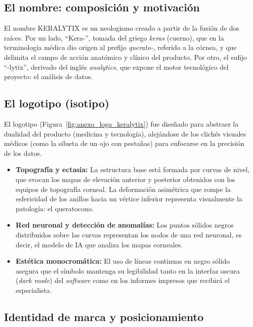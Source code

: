     \subsection*{El nombre: composición y motivación}

        El nombre KERALYTIX es un neologismo creado a partir de la fusión de dos raíces. Por un lado, ``Kera-'', tomada del griego \textit{keras} (cuerno), que en la terminología médica dio origen al prefijo \textit{querato-}, referido a la córnea, y que delimita el campo de acción anatómico y clínico del producto. Por otro, el sufijo ``-lytix'', derivado del inglés \textit{analytics}, que expone el motor tecnológico del proyecto: el análisis de datos.

    \subsection*{El logotipo (isotipo)}

        El logotipo (Figura~\ref{fig:anexo_logo_keralytix}) fue diseñado para abstraer la dualidad del producto (medicina y tecnología), alejándose de los clichés visuales médicos (como la silueta de un ojo con pestañas) para enfocarse en la precisión de los datos.

        \begin{itemize}[leftmargin=*]
            \item \textbf{Topografía y ectasia:} La estructura base está formada por curvas de nivel, que evocan los mapas de elevación anterior y posterior obtenidos con los equipos de topografía corneal. La deformación asimétrica que rompe la esfericidad de los anillos hacia un vértice inferior representa visualmente la patología: el queratocono.

            \item \textbf{Red neuronal y detección de anomalías:} Los puntos sólidos negros distribuidos sobre las curvas representan los nodos de una red neuronal, es decir, el modelo de IA que analiza los mapas corneales.

            \item \textbf{Estética monocromática:} El uso de líneas continuas en negro sólido asegura que el símbolo mantenga su legibilidad tanto en la interfaz oscura (\textit{dark mode}) del \textit{software} como en los informes impresos que recibirá el especialista.
        \end{itemize}

    \subsection*{Identidad de marca y posicionamiento}

